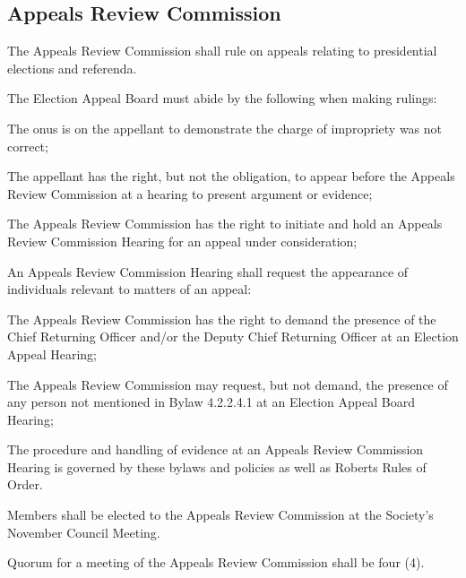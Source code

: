 \subsection{Appeals Review Commission}
\begin{longenum}[ label*=\thesubsection.\arabic*., align=left]
	\item The Appeals Review Commission shall rule on appeals relating to presidential elections and referenda.
    \item The Election Appeal Board must abide by the following when making rulings: 
    \begin{longenum}[ label*=\arabic*., align=left]
		\item The onus is on the appellant to demonstrate the charge of impropriety was not correct;
        \item The appellant has the right, but not the obligation, to appear before the Appeals Review Commission at a hearing to present argument or evidence; 
        \item The Appeals Review Commission has the right to initiate and hold an Appeals Review Commission Hearing for an appeal under consideration; 
        \item An Appeals Review Commission Hearing shall request the appearance of individuals relevant to matters of an appeal:
        \begin{longenum}[ label*=\arabic*., align=left]
			\item The Appeals Review Commission has the right to demand the presence of the Chief Returning Officer and/or the Deputy Chief Returning Officer at an Election Appeal Hearing; 
            \item The Appeals Review Commission may request, but not demand, the presence of any person not mentioned in Bylaw 4.2.2.4.1 at an Election Appeal Board Hearing;
            \item The procedure and handling of evidence at an Appeals Review Commission Hearing is governed by these bylaws and policies as well as Roberts Rules of Order.
            
		\end{longenum}

	\end{longenum}
    
    \item Members shall be elected to the Appeals Review Commission at the Society's November Council Meeting.
    \item Quorum for a meeting of the Appeals Review Commission shall be four (4).
\end{longenum}

